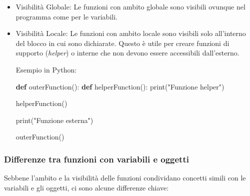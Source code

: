 \documentclass[
  letterpaper,
]{scrbook}
\newenvironment{Shaded}{\begin{snugshade}}{\end{snugshade}}
\newcommand{\BuiltInTok}[1]{\textcolor[rgb]{0.00,0.23,0.31}{#1}}
\newcommand{\KeywordTok}[1]{\textcolor[rgb]{0.00,0.23,0.31}{\textbf{#1}}}
\newcommand{\NormalTok}[1]{\textcolor[rgb]{0.00,0.23,0.31}{#1}}
\newcommand{\StringTok}[1]{\textcolor[rgb]{0.13,0.47,0.30}{#1}}
\providecommand{\tightlist}{%
  \setlength{\itemsep}{0pt}\setlength{\parskip}{0pt}}\usepackage{longtable,booktabs,array}
\newcommand*\circled[1]{\tikz[baseline=(char.base)]{
          \node[shape=circle,draw,inner sep=1pt] (char) {{\scriptsize#1}};}}
\begin{document}
\begin{itemize}
\item
  Visibilità Globale: Le funzioni con ambito globale sono visibili
  ovunque nel programma come per le variabili.
\item
  Visibilità Locale: Le funzioni con ambito locale sono visibili solo
  all'interno del blocco in cui sono dichiarate. Questo è utile per
  creare funzioni di supporto (\emph{helper}) o interne che non devono
  essere accessibili dall'esterno.

  Esempio in Python:

\label{annotated-cell-126}%
\begin{Shaded}
\begin{Highlighting}[]
\KeywordTok{def}\NormalTok{ outerFunction():}
  \KeywordTok{def}\NormalTok{ helperFunction(): }\hspace*{\fill}\NormalTok{\circled{1}}
    \BuiltInTok{print}\NormalTok{(}\StringTok{"Funzione helper"}\NormalTok{)}

\NormalTok{  helperFunction() }\hspace*{\fill}\NormalTok{\circled{2}}

  \BuiltInTok{print}\NormalTok{(}\StringTok{"Funzione esterna"}\NormalTok{)}

\NormalTok{outerFunction()}
\end{Highlighting}
\end{Shaded}

\end{itemize}

\subsubsection{Differenze tra funzioni con variabili e
oggetti}\label{differenze-tra-funzioni-con-variabili-e-oggetti}

Sebbene l'ambito e la visibilità delle funzioni condividano concetti
simili con le variabili e gli oggetti, ci sono alcune differenze chiave:
\end{document}

